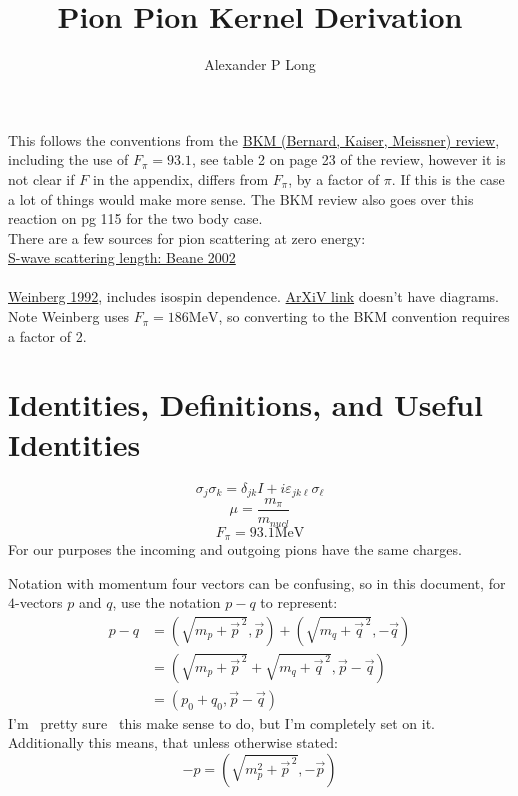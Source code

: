 \documentclass[11pt]{article}
\author{Alexander P Long}
\title{Pion Pion Kernel Derivation}
\newcommand{\sq}{^{\,2}}
\begin{document}
\maketitle
This follows the conventions from the \href{https://arxiv.org/abs/hep-ph/9501384v1}{BKM (Bernard, Kaiser, Meissner)  review}, including the use of $F_\pi=93.1$, see table 2 on page 23 of the review, however it is not clear if $F$ in the appendix, differs from $F_\pi$, by a factor of $\pi$. If this is the case a lot of things would make more sense.
The BKM review also goes over this reaction on pg 115 for the two body case.\\

There are a few sources for pion scattering at zero energy:\\
\href{https://arxiv.org/abs/hep-ph/0206219v1}{S-wave scattering length: Beane 2002}\\~\\
\href{https://www.sciencedirect.com/science/article/abs/pii/037026939290099P}{Weinberg 1992}, includes isospin dependence. \href{https://arxiv.org/pdf/hep-ph/9209257.pdf}{ArXiV link} doesn't have diagrams.
Note Weinberg uses $F_\pi=186 \mathrm{MeV}$, so converting to the BKM convention requires a factor of 2.
\tableofcontents
\section{Identities, Definitions, and Useful Identities}
\begin{equation}
    \sigma_j \sigma_k = \delta_{jk} I + i \varepsilon_{jk\ell} \sigma_{\ell}
\end{equation}
\begin{equation}
    \mu= \frac{m_\pi}{m_{nucl}}
\end{equation}
\begin{equation}
    F_\pi=93.1 \mathrm{MeV}
\end{equation}
For our purposes the incoming and outgoing pions have the same charges.

Notation with momentum four vectors can be confusing, so in this document, for $4$-vectors $p$ and $q$, use the notation
$p-q$ to represent:
\begin{align}
    p-q&= (\sqrt{m_p+\vec{p}\sq}, \vec{p}) + (\sqrt{m_q+\vec{q}\sq},-\vec{q})\\
       &= \left(\sqrt{m_p+\vec{p}\sq}+\sqrt{m_q+\vec{q}\sq},\vec{p}-\vec{q} \right)\\
       &= \left(p_0+q_0,\vec{p}-\vec{q} \right)
\end{align}
I'm ~pretty sure~ this make sense to do, but I'm completely set on it. Additionally this means, that unless otherwise
stated:
\begin{equation}
    -p= \left( \sqrt{m_p^2 + \vec{p}\sq },-\vec{p} \right)
\end{equation}
\end{document}

